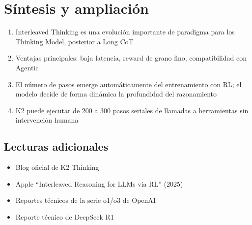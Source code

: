 \section{Síntesis y ampliación}

\begin{enumerate}
  \item Interleaved Thinking es una evolución importante de paradigma para los Thinking Model, posterior a Long CoT
  \item Ventajas principales: baja latencia, reward de grano fino, compatibilidad con Agentic
  \item El número de pasos emerge automáticamente del entrenamiento con RL; el modelo decide de forma dinámica la profundidad del razonamiento
  \item K2 puede ejecutar de 200 a 300 pasos seriales de llamadas a herramientas sin intervención humana
\end{enumerate}

\subsection{Lecturas adicionales}

\begin{itemize}
  \item Blog oficial de K2 Thinking
  \item Apple ``Interleaved Reasoning for LLMs via RL'' (2025)
  \item Reportes técnicos de la serie o1/o3 de OpenAI
  \item Reporte técnico de DeepSeek R1
\end{itemize}


